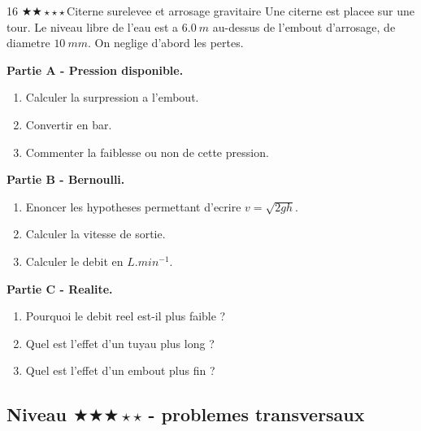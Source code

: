 \documentclass[11pt,a4paper]{article}
\newcommand{\difftwo}{\(\bigstar\bigstar\star\star\star\)}
\newcommand{\diffthree}{\(\bigstar\bigstar\bigstar\star\star\)}
\begin{document}
\begin{probleme}{16 \difftwo}{Citerne surelevee et arrosage gravitaire}
Une citerne est placee sur une tour. Le niveau libre de l'eau est a \(\SI{6.0}{m}\) au-dessus de l'embout d'arrosage, de diametre \(\SI{10}{mm}\). On neglige d'abord les pertes.

\textbf{Partie A - Pression disponible.}
\begin{enumerate}
\item Calculer la surpression a l'embout.
\item Convertir en bar.
\item Commenter la faiblesse ou non de cette pression.
\end{enumerate}

\textbf{Partie B - Bernoulli.}
\begin{enumerate}[resume]
\item Enoncer les hypotheses permettant d'ecrire \(v=\sqrt{2gh}\).
\item Calculer la vitesse de sortie.
\item Calculer le debit en \(\si{L.min^{-1}}\).
\end{enumerate}

\textbf{Partie C - Realite.}
\begin{enumerate}[resume]
\item Pourquoi le debit reel est-il plus faible ?
\item Quel est l'effet d'un tuyau plus long ?
\item Quel est l'effet d'un embout plus fin ?
\end{enumerate}
\end{probleme}

\subsection{Niveau \diffthree{} - problemes transversaux}
\end{document}
